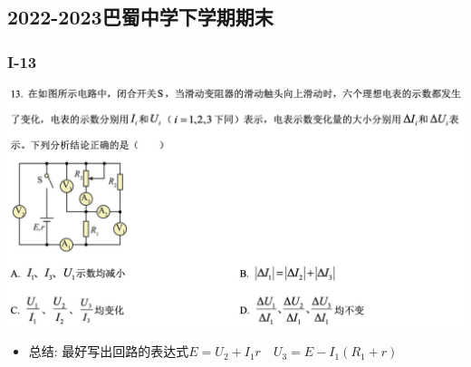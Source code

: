 \documentclass{article}
\begin{document}
    \subsection{2022-2023巴蜀中学下学期期末}
    \subsubsection{I-13}
    \includegraphics[width=50em,keepaspectratio]{./pictures/1.2-8.png}

    \begin{itemize}
        \item 总结: \quad 最好写出回路的表达式$E = U_{2} + I_{1}r  \quad U_{3} = E - I_{1}(R_{1} + r)$ 
    \end{itemize}
\end{document}
